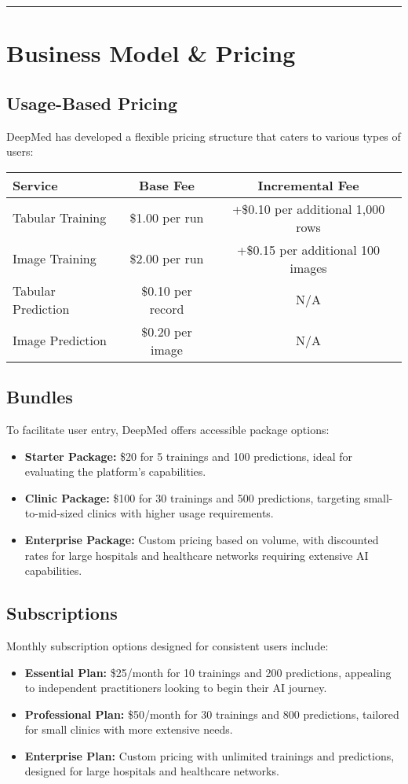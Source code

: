 \documentclass[11pt,a4paper]{article}
\begin{document}
\bigskip\hrule\bigskip

\section{Business Model \& Pricing}

\subsection{Usage-Based Pricing}
DeepMed has developed a flexible pricing structure that caters to various types of users:
\begin{longtable}{@{}lcc@{}}
\toprule
\textbf{Service}               & \textbf{Base Fee}        & \textbf{Incremental Fee}       \\ \midrule
Tabular Training               & \$1.00 per run           & +\$0.10 per additional 1,000 rows   \\
Image Training                 & \$2.00 per run           & +\$0.15 per additional 100 images  \\
Tabular Prediction             & \$0.10 per record        & N/A                            \\
Image Prediction               & \$0.20 per image         & N/A                            \\ \bottomrule
\end{longtable}

\subsection{Bundles}
To facilitate user entry, DeepMed offers accessible package options:
\begin{itemize}
  \item \textbf{Starter Package:} \$20 for 5 trainings and 100 predictions, ideal for evaluating the platform's capabilities.
  \item \textbf{Clinic Package:} \$100 for 30 trainings and 500 predictions, targeting small-to-mid-sized clinics with higher usage requirements.
  \item \textbf{Enterprise Package:} Custom pricing based on volume, with discounted rates for large hospitals and healthcare networks requiring extensive AI capabilities.
\end{itemize}

\subsection{Subscriptions}
Monthly subscription options designed for consistent users include:
\begin{itemize}
  \item \textbf{Essential Plan:} \$25/month for 10 trainings and 200 predictions, appealing to independent practitioners looking to begin their AI journey.
  \item \textbf{Professional Plan:} \$50/month for 30 trainings and 800 predictions, tailored for small clinics with more extensive needs.
  \item \textbf{Enterprise Plan:} Custom pricing with unlimited trainings and predictions, designed for large hospitals and healthcare networks.
\end{itemize}
\end{document}
